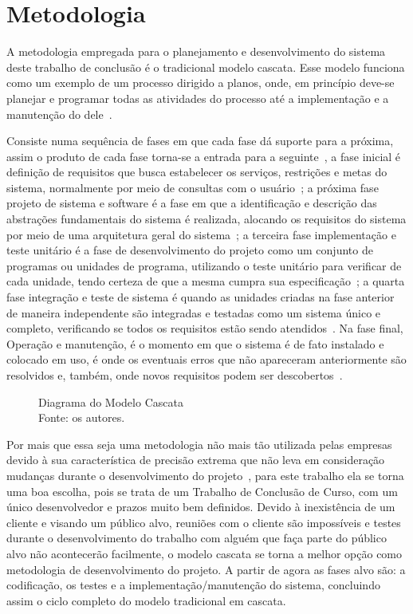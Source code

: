 \chapter{Metodologia}

A metodologia empregada para o planejamento e desenvolvimento do sistema deste trabalho de conclusão é o tradicional modelo cascata.
Esse modelo funciona como um exemplo de um processo dirigido a planos, onde, em princípio deve-se planejar e programar todas as atividades do processo até a implementação e a manutenção do dele~\cite{SOMMERVILLE1}.

Consiste numa sequência de fases em que cada fase dá suporte para a próxima, assim o produto de cada fase torna-se a entrada para a seguinte~\cite{BALTZAN1}, a fase inicial é definição de requisitos que busca estabelecer os serviços, restrições e metas do sistema, normalmente por meio de consultas com o usuário~\cite{SOMMERVILLE1}; a próxima fase projeto de sistema e software é a fase em que a identificação e descrição das abstrações fundamentais do sistema é realizada, alocando os requisitos do sistema por meio de uma arquitetura geral do sistema~\cite{SOMMERVILLE1}; a terceira fase implementação e teste unitário é a fase de desenvolvimento do projeto como um conjunto de programas ou unidades de programa, utilizando o teste unitário para verificar de cada unidade, tendo certeza de que a mesma cumpra sua especificação~\cite{SOMMERVILLE1}; a quarta fase integração e teste de sistema é quando as unidades criadas na fase anterior de maneira independente são integradas e testadas como um sistema único e completo, verificando se todos os requisitos estão sendo atendidos~\cite{SOMMERVILLE1}.
Na fase final, Operação e manutenção, é o momento em que o sistema é de fato instalado e colocado em uso, é onde os eventuais erros que não apareceram anteriormente são resolvidos e, também, onde novos requisitos podem ser descobertos~\cite{SOMMERVILLE1}. 
\begin{figure}[H]
    \centering
    
    \caption[Diagrama do Modelo Cascata]{\label{fig:Modelo_Cascata}
        Diagrama do Modelo Cascata\\
        Fonte: os autores.
    }
\end{figure}
Por mais que essa seja uma metodologia não mais tão utilizada pelas empresas devido à sua característica de precisão extrema que não leva em consideração mudanças durante o desenvolvimento do projeto~\cite{BALTZAN1}, para este trabalho ela se torna uma boa escolha, pois se trata de um Trabalho de Conclusão de Curso, com um único desenvolvedor e prazos muito bem definidos.
Devido à inexistência de um cliente e visando um público alvo, reuniões com o cliente são impossíveis e testes durante o desenvolvimento do trabalho com alguém que faça parte do público alvo não acontecerão facilmente, o modelo cascata se torna a melhor opção como metodologia de desenvolvimento do projeto. A partir de agora as fases alvo são: a codificação, os testes e a implementação/manutenção do sistema, concluindo assim o ciclo completo do modelo tradicional em cascata.
